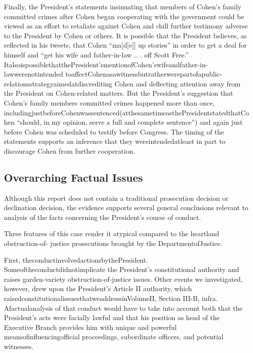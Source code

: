 {Finally, the President's statements insinuating that members of Cohen's family committed crimes after Cohen began cooperating with the government could be viewed as an effort to retaliate against Cohen and chill further testimony adverse to the President by Cohen or others.
It is possible that the President believes, as reflected in his tweets, that Cohen “ma[d]e[] up stories” in order to get a deal for himself and “get his wife and father-in-law .. . off Scott Free.” ItalsoispossiblethatthePresident'smentionofCohen'swifeandfather-in-lawwerenotintended toaffectCohenasawitnessbutratherwerepartofapublic-relationsstrategyaimedatdiscrediting Cohen and deflecting attention away from the President on Cohen-related matters.
But the President's suggestion that Cohen's family members committed crimes happened more than once, includingjustbeforeCohenwassentenced(atthesametimeasthePresidentstatedthatCohen “should, in my opinion, serve a full and complete sentence”) and again just before Cohen was scheduled to testify before Congress.
The timing of the statements supports an inference that they wereintendedatleast in part to discourage Cohen from further cooperation.

\subsection{Overarching Factual Issues}

Although this report does not contain a traditional prosecution decision or declination decision, the evidence supports several general conclusions relevant to analysis of the facts concerning the President's course of conduct.

Three features of this case render it atypical compared to the heartland obstruction-of- justice prosecutions brought by the DepartmentofJustice.

First, theconductinvolvedactionsbythePresident.
Someoftheconductdidnotimplicate the President's constitutional authority and raises garden-variety obstruction-of-justice issues.
Other events we investigated, however, drew upon the President's Article II authority, which raisedconstitutionalissuesthatweaddressinVolumeII, Section III-B, infra.
Afactualanalysis of that conduct would have to take into account both that the President's acts were facially lawful and that his position as head of the Executive Branch provides him with unique and powerful meansofinfluencingofficial proceedings, subordinate officers, and potential witnesses.

}

